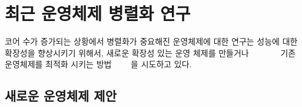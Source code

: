 
\newpage
\section{최근 운영체제 병렬화 연구}
\label{sec:osrelated}

%
 
코어 수가 증가되는 상황에서 병렬화가 중요해진 운영체제에 대한 연구는 성능에
 대한 확장성을 향상시키기 위해서, 새로운 확장성 있는
운영 체제를 만들거나 ~\cite{Boyd-WickizerCorey}~\cite{Wentzlaff2010fOS}
~\cite{Baumann2009Barrelfish}
~\cite{Liu2009Tessellation}~\cite{Farrington2010Helios} 
기존 운영체제를 최적화 시키는
방법~\cite{SilasBoydWickizer2010LinuxScales48}
~\cite{AustinTClements2012RCUBalancedTrees}~\cite{Clements2013RadixVM}~\cite{SilasBoydWickizerPth}을
시도하고 있다.

\subsection{새로운 운영체제 제안}




